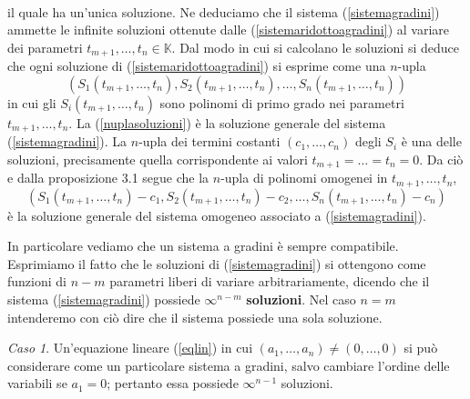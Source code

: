 \documentclass{article}
\theoremstyle{plain}
\theoremstyle{definition}
\theoremstyle{remark}
\newtheorem{case}{Caso}
\begin{document}
\begin{itemize}
\begin{equation}
\begin{aligned}
        \end{aligned}\label{sistemaridottoagradini}
    \end{equation}
    il quale ha un'unica soluzione. 
    Ne deduciamo che il sistema (\ref{sistemagradini}) ammette le infinite soluzioni ottenute dalle (\ref{sistemaridottoagradini}) al variare dei parametri \( t_{m+1}, \ldots, t_n \in \mathbb{K} \).
    Dal modo in cui si calcolano le soluzioni si deduce che ogni soluzione di (\ref{sistemaridottoagradini}) si esprime come una \( n \)-upla
    \begin{equation}
        (S_{1}(t_{m+1}, \ldots, t_n), S_{2}(t_{m+1}, \ldots, t_n), \ldots, S_{n}(t_{m+1}, \ldots, t_n))\label{nuplasoluzioni}
    \end{equation}
    in cui gli \( S_i(t_{m+1}, \ldots, t_n) \) sono polinomi di primo grado nei parametri \( t_{m+1}, \ldots, t_n \).
    La (\ref{nuplasoluzioni}) è la soluzione generale del sistema (\ref{sistemagradini}).
    La \( n \)-upla dei termini costanti \( (c_1, \ldots, c_n) \) degli \( S_i \) è una delle soluzioni, precisamente quella corrispondente ai valori \( t_{m+1} = \ldots = t_n = 0 \). Da ciò e dalla proposizione 3.1 segue che la \( n \)-upla di polinomi omogenei in \( t_{m+1}, \ldots, t_n \),
    \[ (S_{1}(t_{m+1}, \ldots, t_n) - c_1, S_{2}(t_{m+1}, \ldots, t_n) - c_2, \ldots, S_{n}(t_{m+1}, \ldots, t_n) - c_n) \]
    è la soluzione generale del sistema omogeneo associato a (\ref{sistemagradini}).
\end{itemize}

\vspace{10pt}

In particolare vediamo che un sistema a gradini è sempre compatibile. 
Esprimiamo il fatto che le soluzioni di (\ref{sistemagradini}) si ottengono come funzioni di \( n - m \) parametri liberi di variare arbitrariamente, dicendo che il sistema (\ref{sistemagradini}) possiede \( \infty^{n-m} \) \textbf{soluzioni}. 
Nel caso \( n = m \) intenderemo con ciò dire che il sistema possiede una sola soluzione.

\vspace{10pt}

\begin{case}
    Un'equazione lineare (\ref{eqlin}) in cui \( (a_1, \ldots, a_n) \neq (0, \ldots, 0) \) si può considerare come un particolare sistema a gradini, salvo cambiare l'ordine delle variabili se \( a_1 = 0 \); pertanto essa possiede \( \infty^{n-1} \) soluzioni.
\end{case}
\end{document}
